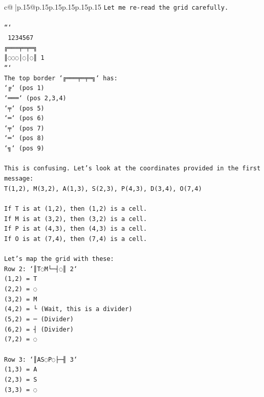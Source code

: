 \documentclass{article}
\begin{document}
{\begin{supertabular}{c@{$\;$}|p{.15\linewidth}@{}p{.15\linewidth}p{.15\linewidth}p{.15\linewidth}p{.15\linewidth}p{.15\linewidth}}
{{{\texttt{Let me re{-}read the grid carefully.} \\
\\ 
\texttt{```} \\
\texttt{ 1234567} \\
\texttt{╔═══╤═╤═╗} \\
\texttt{║◌◌◌│◌│◌║ 1} \\
\texttt{```} \\
\texttt{The top border `╔═══╤═╤═╗` has:} \\
\texttt{`╔` (pos 1)} \\
\texttt{`═══` (pos 2,3,4)} \\
\texttt{`╤` (pos 5)} \\
\texttt{`═` (pos 6)} \\
\texttt{`╤` (pos 7)} \\
\texttt{`═` (pos 8)} \\
\texttt{`╗` (pos 9)} \\
\\ 
\texttt{This is confusing. Let's look at the coordinates provided in the first message:} \\
\texttt{T(1,2), M(3,2), A(1,3), S(2,3), P(4,3), D(3,4), O(7,4)} \\
\\ 
\texttt{If T is at (1,2), then (1,2) is a cell.} \\
\texttt{If M is at (3,2), then (3,2) is a cell.} \\
\texttt{If P is at (4,3), then (4,3) is a cell.} \\
\texttt{If O is at (7,4), then (7,4) is a cell.} \\
\\ 
\texttt{Let's map the grid with these:} \\
\texttt{Row 2: `║T◌M└─┤◌║ 2`} \\
\texttt{(1,2) = T} \\
\texttt{(2,2) = ◌} \\
\texttt{(3,2) = M} \\
\texttt{(4,2) = └ (Wait, this is a divider)} \\
\texttt{(5,2) = ─ (Divider)} \\
\texttt{(6,2) = ┤ (Divider)} \\
\texttt{(7,2) = ◌} \\
\\ 
\texttt{Row 3: `║AS◌P◌├─╢ 3`} \\
\texttt{(1,3) = A} \\
\texttt{(2,3) = S} \\
\texttt{(3,3) = ◌} \\
}}}
\end{supertabular}}
\end{document}
